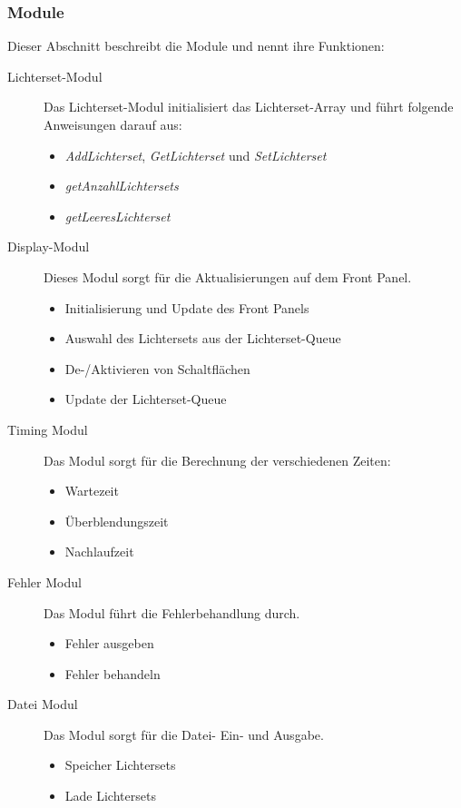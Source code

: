 \subsubsection{Module}
Dieser Abschnitt beschreibt die Module und nennt ihre Funktionen:
\begin{description}
\item[Lichterset-Modul] Das Lichterset-Modul initialisiert das Lichterset-Array und führt folgende Anweisungen darauf aus:
	\begin{itemize}
	\item \textit{AddLichterset}, \textit{GetLichterset} und \textit{SetLichterset}
	\item \textit{getAnzahlLichtersets}
	\item \textit{getLeeresLichterset}
	\end{itemize}

\item[Display-Modul] Dieses Modul sorgt für die Aktualisierungen auf dem Front Panel.
	\begin{itemize}
	\item Initialisierung und Update des Front Panels
	\item Auswahl des Lichtersets aus der Lichterset-Queue
	\item De-/Aktivieren von Schaltflächen
	\item Update der Lichterset-Queue
	\end{itemize}

\item[Timing Modul] Das Modul sorgt für die Berechnung der verschiedenen Zeiten:
	\begin{itemize}
	\item Wartezeit
	\item Überblendungszeit
	\item Nachlaufzeit
	\end{itemize}
\item[Fehler Modul] Das Modul führt die Fehlerbehandlung durch.
	\begin{itemize}
	\item Fehler ausgeben
	\item Fehler behandeln
	\end{itemize}

\item[Datei Modul] Das Modul sorgt für die Datei- Ein- und Ausgabe.
	\begin{itemize}
	\item Speicher Lichtersets
	\item Lade Lichtersets
	\end{itemize}

\end{description}

